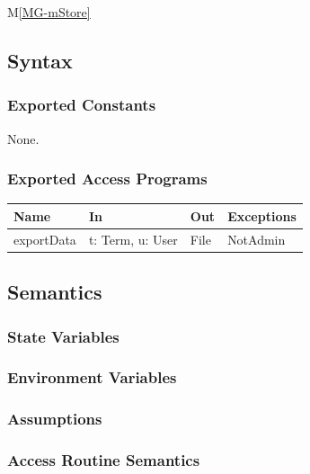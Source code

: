 \documentclass[12pt, titlepage]{article}
\newcommand{\mref}[1]{M\ref{MG-#1}}
\begin{document}
\mref{mStore}

\subsection{Syntax}

\subsubsection{Exported Constants}

None.

\subsubsection{Exported Access Programs}

\begin{center}\small
\begin{tabular}{>{\raggedright\arraybackslash}p{3.3cm} >{\raggedright\arraybackslash}p{4.1cm} >{\raggedright\arraybackslash}p{3.4cm} >{\raggedright\arraybackslash}p{4.0cm}}
\hline
\textbf{Name} & \textbf{In} & \textbf{Out} & \textbf{Exceptions} \\
\hline
exportData & t: Term, u: User & File & NotAdmin \\
\hline
\end{tabular}
\end{center}

\subsection{Semantics}

\subsubsection{State Variables}


\subsubsection{Environment Variables}


\subsubsection{Assumptions}


\subsubsection{Access Routine Semantics}
\end{document}
